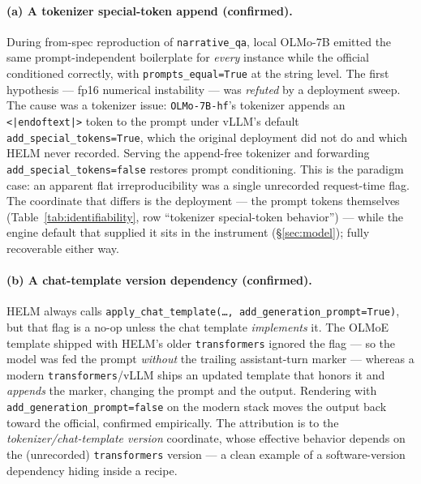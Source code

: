 \paragraph{(a) A tokenizer special-token append (confirmed).} During from-spec
reproduction of \texttt{narrative\_qa}, local OLMo-7B emitted the same
prompt-independent boilerplate for \emph{every} instance while the official
conditioned correctly, with \texttt{prompts\_equal=True} at the string level. The
first hypothesis --- fp16 numerical instability --- was \emph{refuted} by a
deployment sweep. The cause was a tokenizer issue: \texttt{OLMo-7B-hf}'s tokenizer
appends an \texttt{<|endoftext|>} token to the prompt under vLLM's default
\texttt{add\_special\_tokens=True}, which the original deployment did not do and
which HELM never recorded. Serving the append-free tokenizer and forwarding
\texttt{add\_special\_tokens=false} restores prompt conditioning. This is the
paradigm case: an apparent flat irreproducibility was a single unrecorded
request-time flag. The coordinate that differs is the deployment --- the prompt
tokens themselves (Table~\ref{tab:identifiability}, row ``tokenizer
special-token behavior'') --- while the engine default that supplied it sits in
the instrument (\S\ref{sec:model}); fully recoverable either way.

\paragraph{(b) A chat-template version dependency (confirmed).} HELM always calls
\texttt{apply\_chat\_template(\ldots, add\_generation\_prompt=True)}, but that flag
is a no-op unless the chat template \emph{implements} it. The OLMoE template
shipped with HELM's older \texttt{transformers} ignored the flag --- so the model
was fed the prompt \emph{without} the trailing assistant-turn marker --- whereas a
modern \texttt{transformers}/vLLM ships an updated template that honors it and
\emph{appends} the marker, changing the prompt and the output. Rendering with
\texttt{add\_generation\_prompt=false} on the modern stack moves the output back
toward the official, confirmed empirically. The attribution is to the
\emph{tokenizer/chat-template version} coordinate, whose effective behavior
depends on the (unrecorded) \texttt{transformers} version --- a clean example of a
software-version dependency hiding inside a recipe.

